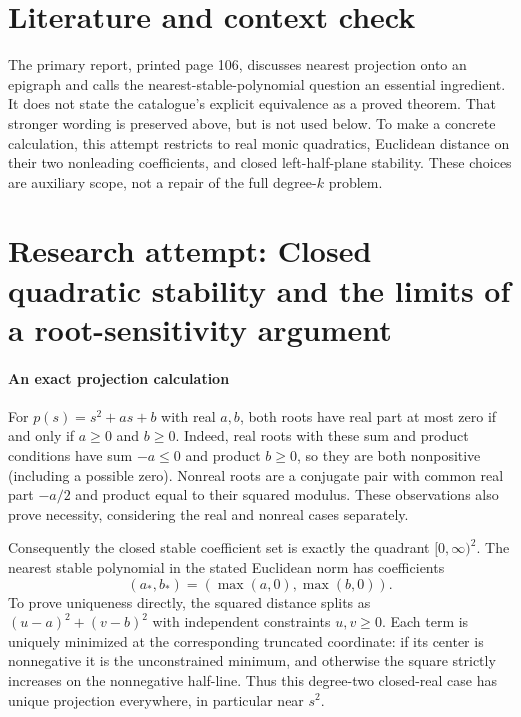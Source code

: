 \documentclass[11pt]{article}
\begin{document}
\section{Literature and context check}
The primary report, printed page 106, discusses nearest projection onto an epigraph and calls the nearest-stable-polynomial question an essential ingredient. It does not state the catalogue's explicit equivalence as a proved theorem. That stronger wording is preserved above, but is not used below. To make a concrete calculation, this attempt restricts to real monic quadratics, Euclidean distance on their two nonleading coefficients, and closed left-half-plane stability. These choices are auxiliary scope, not a repair of the full degree-$k$ problem.
\section{Research attempt: Closed quadratic stability and the limits of a root-sensitivity argument}

\paragraph{An exact projection calculation}
For $p(s)=s^2+as+b$ with real $a,b$, both roots have real part at most zero if and only if $a\geq0$ and $b\geq0$. Indeed, real roots with these sum and product conditions have sum $-a\leq0$ and product $b\geq0$, so they are both nonpositive (including a possible zero). Nonreal roots are a conjugate pair with common real part $-a/2$ and product equal to their squared modulus. These observations also prove necessity, considering the real and nonreal cases separately.

Consequently the closed stable coefficient set is exactly the quadrant $[0,\infty)^2$. The nearest stable polynomial in the stated Euclidean norm has coefficients
\[
 (a_*,b_*)=(\max(a,0),\max(b,0)).
\]
To prove uniqueness directly, the squared distance splits as $(u-a)^2+(v-b)^2$ with independent constraints $u,v\geq0$. Each term is uniquely minimized at the corresponding truncated coordinate: if its center is nonnegative it is the unconstrained minimum, and otherwise the square strictly increases on the nonnegative half-line. Thus this degree-two closed-real case has unique projection everywhere, in particular near $s^2$.
\end{document}
